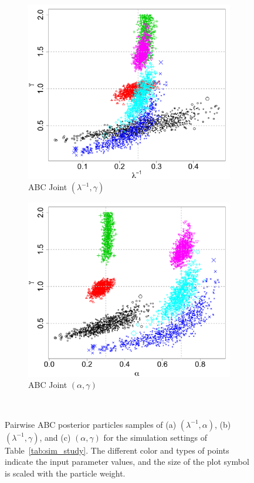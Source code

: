 \documentclass[12pt]{article}
\begin{document}
\begin{figure}[htbp]
\begin{subfigure}{0.32\textwidth}
\includegraphics[width = \textwidth]{figures/joint_k_gamma.pdf} 
\caption{ABC Joint $(\lambda^{-1}, \gamma)$}\label{subfig:joint_gamma_k}
\end{subfigure}
\begin{subfigure}{0.32\textwidth}
\centering
\includegraphics[width = \textwidth]{figures/joint_alpha_gamma.pdf} 
\caption{ABC Joint $(\alpha, \gamma)$}\label{subfig:joint_gamma_alpha}
\end{subfigure} \\
\caption{Pairwise ABC posterior particles samples of (a) $(\lambda^{-1}, \alpha)$, (b) $(\lambda^{-1}, \gamma)$, and (c) $(\alpha, \gamma)$ for the simulation settings of Table~\ref{tab:sim_study}.  The different color and types of points indicate the input parameter values, and the size of the plot symbol is scaled with the particle weight.
}
\label{fig:abc_pa_joints}
\end{figure}
\end{document}
